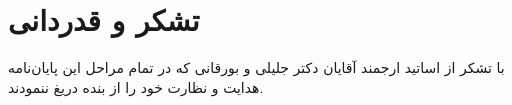 \chapter*{تشکر و قدردانی}
\Huge
با تشکر از اساتيد ارجمند آقايان دکتر جلیلی و بورقانی که در تمام مراحل اين پايان‌نامه هدايت و نظارت خود را از بنده دريغ ننمودند.
\normalsize

\clearpage